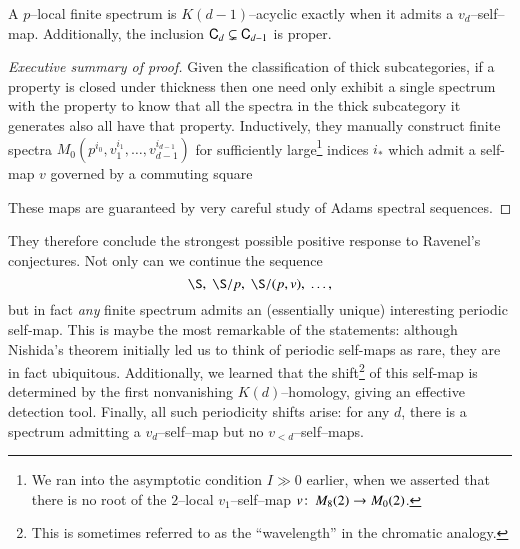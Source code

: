 \begin{theorem}\label{CdEqualsDd}
A $p$--local finite spectrum is $K(d-1)$--acyclic exactly when it admits a $v_d$--self--map.  Additionally, the inclusion $\mathsf{C}_d \subsetneq \mathsf{C}_{d-1}$ is proper.
\end{theorem}
\begin{proof}[Executive summary of proof]
Given the classification of thick subcategories, if a property is closed under thickness then one need only exhibit a single spectrum with the property to know that all the spectra in the thick subcategory it generates also all have that property.  Inductively, they manually construct finite spectra $M_0(p^{i_0}, v_1^{i_1}, \ldots, v_{d-1}^{i_{d-1}})$ for sufficiently large\footnote{We ran into the asymptotic condition $I \gg 0$ earlier, when we asserted that there is no root of the $2$--local $v_1$--self--map $v\colon\thinspace M_8(2) \to M_0(2)$.} indices $i_*$ which admit a self-map $v$ governed by a commuting square
\begin{center}
\end{center}
These maps are guaranteed by very careful study of Adams spectral sequences.
\end{proof}

They therefore conclude the strongest possible positive response to Ravenel's conjectures.  Not only can we continue the sequence \[\S, \; \S/p, \; \S/(p, v), \; \ldots,\] but in fact \emph{any} finite spectrum admits an (essentially unique) interesting periodic self-map.  This is maybe the most remarkable of the statements: although Nishida's theorem initially led us to think of periodic self-maps as rare, they are in fact ubiquitous.  Additionally, we learned that the shift\footnote{This is sometimes referred to as the ``wavelength'' in the chromatic analogy.} of this self-map is determined by the first nonvanishing $K(d)$--homology, giving an effective detection tool.  Finally, all such periodicity shifts arise: for any $d$, there is a spectrum admitting a $v_d$--self--map but no $v_{<d}$--self--maps.








